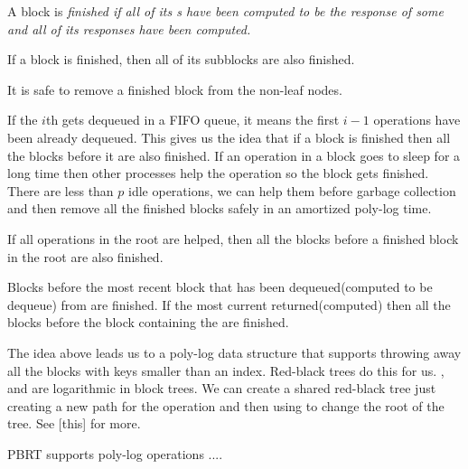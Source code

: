 \begin{definition}
A block  is \it{finished} if all of its s have been computed to be the response of some  and all of its  responses have been computed.  
\end{definition}

\begin{corollary}
If a block is finished, then all of its subblocks are also finished.  
\end{corollary}

\begin{lemma}
It is safe to remove a finished block from the non-leaf nodes.
\end{lemma}

If the $i$th  gets dequeued in a FIFO queue, it means the first $i-1$  operations have been already dequeued. This gives us the idea that if a block is finished then all the blocks before it are also finished. If an operation in a block goes to sleep for a long time then other processes help the operation so the block gets finished. There are less than $p$ idle operations, we can help them before garbage collection and then remove all the finished blocks safely in an amortized poly-log time.

\begin{lemma}
    If all  operations in the root are helped, then all the blocks before a finished block in the root are also finished.
\end{lemma}

\begin{lemma}
  Blocks before the most recent block that has been dequeued(computed to be dequeue) from are finished. If the most current  returned(computed)  then all the blocks before the block containing the  are finished.
\end{lemma}

The idea above leads us to a poly-log data structure that supports throwing away all the blocks with keys smaller than an index. Red-black trees do this for us. ,  and  are logarithmic in block trees.
We can create a shared red-black tree just creating a new path for the operation and then using  to change the root of the tree. See [this] for more.

\begin{observation}
PBRT supports poly-log operations ....
\end{observation}

